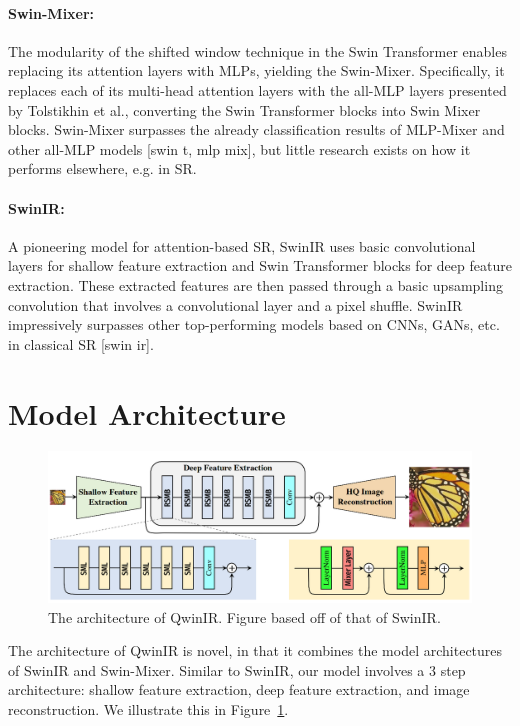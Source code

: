 \documentclass{article}
\begin{document}
\paragraph{Swin-Mixer:} The modularity of the shifted window technique in the Swin Transformer enables replacing its attention layers with MLPs, yielding the Swin-Mixer. Specifically, it replaces each of its multi-head attention layers with the all-MLP layers presented by Tolstikhin et al., converting the Swin Transformer blocks into Swin Mixer blocks. Swin-Mixer surpasses the already classification results of MLP-Mixer and other all-MLP models [swin t, mlp mix], but little research exists on how it performs elsewhere, e.g. in SR.

\paragraph{SwinIR:} A pioneering model for attention-based SR, SwinIR uses basic convolutional layers for shallow feature extraction and Swin Transformer blocks for deep feature extraction. These extracted features are then passed through a basic upsampling convolution that involves a convolutional layer and a pixel shuffle. SwinIR impressively surpasses other top-performing models based on CNNs, GANs, etc. in classical SR [swin ir].

\section{Model Architecture}

\begin{figure}\label{fig:architecture}
    \centering
    \includegraphics[width=\textwidth]{qwinir-architecture.png}
    \caption{The architecture of QwinIR. Figure based off of that of SwinIR.}
\end{figure}

The architecture of QwinIR is novel, in that it combines the model architectures of SwinIR and Swin-Mixer. Similar to SwinIR, our model involves a 3 step architecture: shallow feature extraction, deep feature extraction, and image reconstruction. We illustrate this in Figure~\ref{fig:architecture}.
\end{document}
